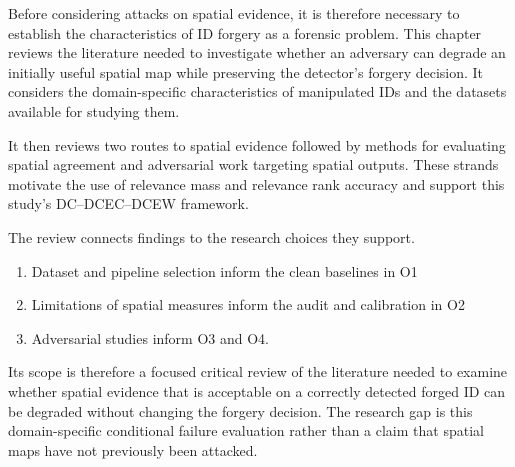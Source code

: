Before considering attacks on spatial evidence, it is therefore necessary to establish the characteristics of ID forgery as a forensic problem. This chapter reviews the literature needed to investigate whether an adversary can degrade an initially useful spatial map while preserving the detector's forgery decision. It considers the domain-specific characteristics of manipulated IDs and the datasets available for studying them. 

It then reviews two routes to spatial evidence followed by methods for evaluating spatial agreement and adversarial work targeting spatial outputs. These strands motivate the use of relevance mass and relevance rank accuracy and support this study's DC--DCEC--DCEW framework. 

The review connects findings to the research choices they support. 
\begin{enumerate}[itemsep=1pt]
    \item Dataset and pipeline selection inform the clean baselines in O1
    \item Limitations of spatial measures inform the audit and calibration in O2
    \item Adversarial studies inform O3 and O4.
\end{enumerate}

Its scope is therefore a focused critical review of the literature needed to examine whether spatial evidence that is acceptable on a correctly detected forged ID can be degraded without changing the forgery decision. The research gap is this domain-specific conditional failure evaluation rather than a claim that spatial maps have not previously been attacked.




